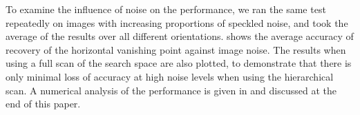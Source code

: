 To examine the influence of noise on the performance, we ran the same test
repeatedly on images with increasing proportions of speckled noise, and took
the average of the results over all different orientations.
 shows the average accuracy of recovery of the
horizontal vanishing point against image noise.  The results when using a full
scan of the search space are also plotted, to demonstrate that there is only minimal 
loss of accuracy at high noise levels when using the hierarchical scan.  
A numerical analysis of the performance is given in 
and discussed at the end of this paper.





